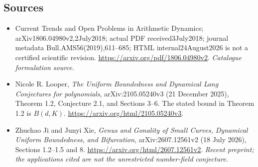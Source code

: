 \documentclass[11pt,a4paper]{article}
\begin{document}
\subsection{Sources}
\begin{itemize}\raggedright
\item[\textnormal{[S1]}]\hypertarget{source:30006792:1}{} Current Trends and Open Problems in Arithmetic Dynamics; arXiv1806.04980v2,2July2018; actual PDF received3July2018; journal metadata Bull.AMS56(2019),611–685; HTML internal24August2026 is not a certified scientific revision.
\url{https://arxiv.org/pdf/1806.04980v2}.
{\small\textit{Catalogue formulation source.}}
\item[\textnormal{[E1]}]\hypertarget{extra:30006792:1}{} Nicole R. Looper,
\emph{The Uniform Boundedness and Dynamical Lang Conjectures for polynomials},
arXiv:2105.05240v3 (21 December 2025), Theorem 1.2, Conjecture 2.1, and
Sections 3--6. The stated bound in Theorem 1.2 is $B(d,K)$.
\url{https://arxiv.org/html/2105.05240v3}.
\item[\textnormal{[E2]}]\hypertarget{extra:30006792:2}{} Zhuchao Ji and Junyi Xie,
\emph{Genus and Gonality of Small Curves, Dynamical Uniform Boundedness, and Bifurcation},
arXiv:2607.12561v2 (18 July 2026), Sections 1.2--1.5 and 8.
\url{https://arxiv.org/html/2607.12561v2}.
{\small\textit{Recent preprint; the applications cited are not the unrestricted number-field conjecture.}}
\end{itemize}
\end{document}
